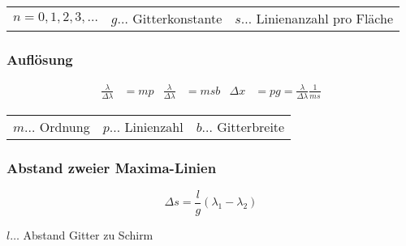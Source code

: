 			\begin{table}[h]
			\begin{tabular}{lll}
			$n=0,1,2,3,\dots$ & $g\dots$ Gitterkonstante & $s\dots$ Linienanzahl pro Fläche\\
			\end{tabular}
			\end{table}

			\subsubsection{Auflösung}
				\begin{align*}
					\frac{\lambda}{\Delta\lambda}&=mp & \frac{\lambda}{\Delta\lambda}&=msb
					& \Delta x&=pg=\frac{\lambda}{\Delta \lambda}\frac{1}{ms}
				\end{align*}
				
				\begin{table}[h]
				\begin{tabular}{lll}
				$m\dots$ Ordnung & $p\dots$ Linienzahl & $b\dots$ Gitterbreite\\
				\end{tabular}
				\end{table}
		
			\subsubsection{Abstand zweier Maxima-Linien}
				\[
					\Delta s=\frac{l}{g}(\lambda_1-\lambda_2)
				\]

				$l\dots$ Abstand Gitter zu Schirm

